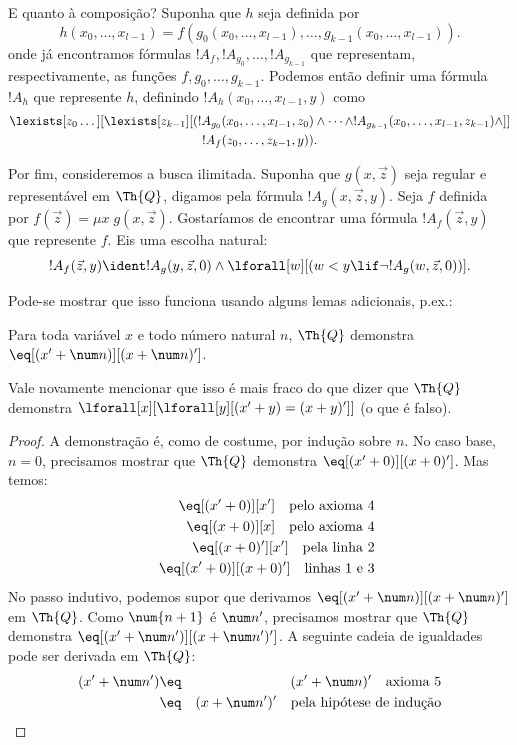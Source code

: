 \documentclass[../../../include/open-logic-section]{subfiles}
\begin{document}
E quanto à composição? Suponha que $h$ seja definida por
\[
h(x_0,\dots,x_{l-1}) = f(g_0(x_0,\dots,x_{l-1}), \dots,
g_{k-1}(x_0,\dots,x_{l-1})).
\]
onde já encontramos fórmulas $!A_f, !A_{g_0}, \dots,
!A_{g_{k-1}}$ que representam, respectivamente, as funções
$f,g_0,\dots,g_{k-1}$. Podemos então definir uma fórmula $!A_h$ que
represente $h$, definindo $!A_h(x_0,\dots,x_{l-1},y)$ como
\begin{multline*}
  \lexists[z_0\dots][\lexists[z_{k-1}][(!A_{g_0}(x_0,\dots,x_{l-1},z_0) \land
  \dots \land !A_{g_{k-1}}(x_0,\dots,x_{l-1},z_{k-1}) \land]]\\
  !A_f(z_0,\dots,z_{k-1},y)).
\end{multline*}

Por fim, consideremos a busca ilimitada. Suponha que $g(x,\vec z)$ seja
regular e representável em $\Th{Q}$, digamos pela fórmula $!A_g(x,\vec
z,y)$. Seja $f$ definida por $f(\vec z) = \mu x \; g(x,\vec z)$. Gostaríamos
de encontrar uma fórmula $!A_f(\vec z,y)$ que represente $f$. Eis uma
escolha natural:
\[
!A_f(\vec z,y) \ident !A_g(y,\vec z,0) \land \lforall[w][(w < y
\lif \lnot !A_g(w,\vec z,0))].
\]

Pode-se mostrar que isso funciona usando alguns lemas adicionais, p.ex.:

\begin{lem}
  Para toda variável $x$ e todo número natural $n$, $\Th{Q}$ demonstra $\eq[(x'
  + \num n)][(x + \num n)']$.
\end{lem}

Vale novamente mencionar que isso é mais fraco do que dizer que $\Th{Q}$
demonstra $\lforall[x][\lforall[y][(x' + y) = (x +y)']]$ (o que é falso).

\begin{proof}
A demonstração é, como de costume, por indução sobre $n$. No caso base,
$n = 0$, precisamos mostrar que $\Th{Q}$ demonstra
$\eq[(x'+0)][(x+0)']$. Mas temos:
\begin{eqnarray*}
& & \eq[(x' + 0)][x'] \quad \text{pelo axioma 4} \\
& & \eq[(x + 0)][x] \quad \text{pelo axioma 4} \\
& & \eq[(x+0)'][x'] \quad \text{pela linha 2} \\
& & \eq[(x' + 0)][(x + 0)'] \quad \text{linhas 1 e 3}
\end{eqnarray*}
No passo indutivo, podemos supor que derivamos $\eq[(x' +
  \num n)][(x + \num n)']$ em $\Th{Q}$. Como $\num{n+1}$ é $\num n'$,
precisamos mostrar que $\Th{Q}$ demonstra $\eq[(x' + \num n')][(x + \num
n')']$. A seguinte cadeia de igualdades pode ser derivada em $\Th{Q}$:
\begin{eqnarray*}
(x' + \num n') & \eq & (x' + \num n)' \quad \text{axioma 5} \\
& \eq & (x + \num n')' \quad \text{pela hipótese de indução}
\end{eqnarray*}
\end{proof}
\end{document}
